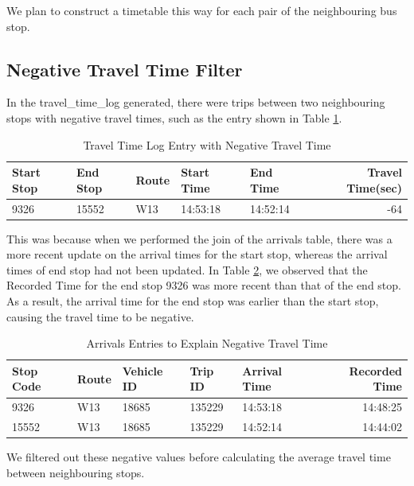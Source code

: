 \par We plan to construct a timetable this way for each pair of the neighbouring bus stop.

\subsection{Negative Travel Time Filter}
\par In the travel\_time\_log generated, there were trips between two neighbouring stops with negative travel times, such as the entry shown in Table \ref{table:travel_time_log_negative}.

\begin{table}
\centering
\begin{tabular}{@{}lllllr@{}} \toprule
Start Stop & End Stop & Route & Start Time & End Time & Travel Time(sec) \\ \midrule
9326 & 15552 & W13 & 14:53:18 & 14:52:14 & -64 \\ \bottomrule
\end{tabular}
\caption{Travel Time Log Entry with Negative Travel Time}
\label{table:travel_time_log_negative}
\end{table}

\par This was because when we performed the join of the arrivals table, there was a more recent update on the arrival times for the start stop, whereas the arrival times of end stop had not been updated. In Table \ref{table:negative_travel_time_explained}, we observed that the Recorded Time for the end stop 9326 was more recent than that of the end stop. As a result, the arrival time for the end stop was earlier than the start stop, causing the travel time to be negative.

\begin{table}
\centering
\begin{tabular}{@{}lllllr@{}} \toprule
Stop Code & Route & Vehicle ID & Trip ID & Arrival Time & Recorded Time\\ \midrule
9326 & W13 & 18685 & 135229 &  14:53:18 & 14:48:25 \\ [0.4cm]
15552 & W13 & 18685 & 135229 & 14:52:14 & 14:44:02 \\ \bottomrule
\end{tabular}
\caption{Arrivals Entries to Explain Negative Travel Time}
\label{table:negative_travel_time_explained}
\end{table}

\par We filtered out these negative values before calculating the average travel time between neighbouring stops.
